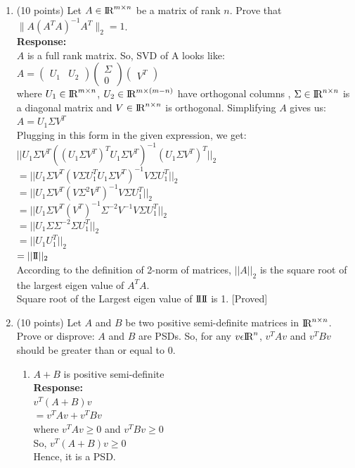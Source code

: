 \documentclass[11pt]{article}
\begin{document}
\begin{enumerate}

\item (10 points) Let $A \in {\rm\hbox{I\kern-.15em R}}^{m \times n}$ be a matrix of rank $n$. Prove that $\| A(A^T A)^{-1} A^T \|_2 = 1$.\\
\textbf{Response:}\\
$A$ is a full rank matrix. So, SVD of A looks like:\\
$A = \begin{pmatrix} U_1 & U_2 \end{pmatrix} \begin{pmatrix}\Sigma \\ 0 \end{pmatrix} \begin{pmatrix} V^T \end{pmatrix}$\\
where $U_1 \in {\rm\hbox{I\kern-.15em R}}^{m \times n}$, $U_2 \in {\rm\hbox{I\kern-.15em R}}^{m \times (m-n)}$ have orthogonal columns , $\Sigma \in {\rm\hbox{I\kern-.15em R}}^{n \times n}$ is a  diagonal matrix and $V \in {\rm\hbox{I\kern-.15em R}}^{n \times n}$ is orthogonal. Simplifying $A$ gives us:\\
$A = U_1 \Sigma V^T$\\
 Plugging in this form in the given expression, we get:\\
 $||U_1 \Sigma V^T ((U_1 \Sigma V^T)^T U_1 \Sigma V^T)^{-1} (U_1 \Sigma V^T)^T||_2$\\
 $= ||U_1 \Sigma V^T (V \Sigma U_1^T U_1 \Sigma V^T)^{-1} V \Sigma U_1^T||_2$\\
 $= ||U_1 \Sigma V^T (V \Sigma^2 V^T)^{-1} V \Sigma U_1^T||_2$\\
 $= ||U_1 \Sigma V^T (V^T)^{-1} \Sigma^{-2} V^{-1} V \Sigma U_1^T||_2$\\
 $= ||U_1 \Sigma  \Sigma^{-2} \Sigma U_1^T||_2$\\
 $= ||U_1 U_1^T||_2$\\
 $= ||{\rm\hbox{I\kern-.15em I}}||_2$\\

 According to the definition of 2-norm of matrices, $||A||_2$ is the square root of the largest eigen value of $A^T A$.\\
 Square root of the Largest eigen value of ${\rm\hbox{I\kern-.15em I}} {\rm\hbox{I\kern-.15em I}}$ is 1. [Proved]

\item (10 points) Let $A$ and $B$ be two positive semi-definite matrices in ${\rm\hbox{I\kern-.15em R}}^{n \times n}$. Prove or disprove: 
$A$ and $B$ are PSDs. So, for any $v \epsilon {\rm\hbox{I\kern-.15em R}}^n$, $v^T A v$ and $v^T B v$ should be greater than or equal to $0$.
\begin{enumerate}
\item $A+B$ is positive semi-definite\\
\textbf{Response:}\\
$v^T (A+B) v$\\
$= v^T A v + v^T B v$\\
where $v^T A v \geq 0$ and $v^T B v \geq 0$\\
So, $v^T (A+B) v \geq 0$\\
Hence, it is a PSD.  \\


\end{enumerate}
\end{enumerate}
\end{document}
